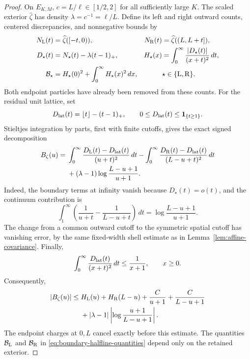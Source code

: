 \documentclass[11pt,reqno]{amsart}
\numberwithin{equation}{section}
\theoremstyle{definition}
\theoremstyle{remark}
\newcommand{\1}{\mathbf 1}
\newcommand{\dd}{\,d}
\newcommand{\calB}{\mathcal B}
\newcommand{\abs}[1]{\left\lvert #1\right\rvert}
\begin{document}
\begin{proof}
On $E_{K,M}$, $c=L/\ell\in[1/2,2]$ for all sufficiently large $K$.
The scaled exterior $\widehat\zeta$ has density
$\lambda=c^{-1}=\ell/L$. Define its left and right outward counts,
centered discrepancies, and nonnegative bounds by
\begin{equation}\label{eq:boundary-halfline-quantities}
\begin{aligned}
N_{\rm L}(t)&=\widehat\zeta([-t,0)),&
N_{\rm R}(t)&=\widehat\zeta((L,L+t]),\\
D_\star(t)&=N_\star(t)-\lambda(t-1)_+,&
H_\star(x)&=\int_0^\infty\frac{|D_\star(t)|}{(x+t)^2}\dd t,\\
\calB_\star&=H_\star(0)^2+\int_0^\infty H_\star(x)^2\dd x,
& &\star\in\{{\rm L},{\rm R}\}.
\end{aligned}
\end{equation}
Both endpoint particles have already been removed from these counts.
For the residual unit lattice, set
\[
D_{\rm lat}(t)=\lfloor t\rfloor-(t-1)_+,\qquad
0\le D_{\rm lat}(t)\le\1_{\{t\ge1\}}.
\]
Stieltjes integration by parts, first with finite cutoffs, gives the
exact signed decomposition
\begin{equation}\label{eq:force-decomposition}
\begin{split}
B_\zeta(u)
={}&\int_0^\infty\frac{D_{\rm L}(t)-D_{\rm lat}(t)}{(u+t)^2}\dd t
   -\int_0^\infty\frac{D_{\rm R}(t)-D_{\rm lat}(t)}{(L-u+t)^2}\dd t\\
&+(\lambda-1)\log\frac{L-u+1}{u+1}.
\end{split}
\end{equation}
Indeed, the boundary terms at infinity vanish because
$D_\star(t)=o(t)$, and the continuum contribution is
\[
\int_1^\infty\left(\frac1{u+t}-\frac1{L-u+t}\right)\dd t
 =\log\frac{L-u+1}{u+1}.
\]
The change from a common outward cutoff to the symmetric spatial
cutoff has vanishing error, by the same fixed-width shell estimate as
in Lemma~\ref{lem:affine-covariance}. Finally,
\[
\int_0^\infty\frac{D_{\rm lat}(t)}{(x+t)^2}\dd t
\le\frac1{x+1},\qquad x\ge0.
\]
Consequently,
\begin{equation}\label{eq:force-pointwise}
\begin{split}
|B_\zeta(u)|\le{}&
H_{\rm L}(u)+H_{\rm R}(L-u)+\frac C{u+1}+\frac C{L-u+1}\\
&+|\lambda-1|\abs{\log\frac{u+1}{L-u+1}}.
\end{split}
\end{equation}
The endpoint charges at $0,L$ cancel exactly before this estimate.
The quantities $\calB_{\rm L}$ and $\calB_{\rm R}$ in
\eqref{eq:boundary-halfline-quantities} depend only on the retained exterior.


\end{proof}
\end{document}
